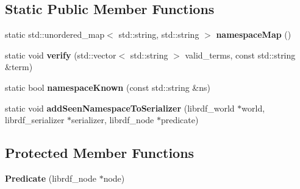 \subsection*{Static Public Member Functions}
\begin{DoxyCompactItemize}
\item 
\mbox{\label{classsemsim_1_1Predicate_a332f745e39155ff5884e2c98c87b548b}} 
static std\+::unordered\+\_\+map$<$ std\+::string, std\+::string $>$ {\bfseries namespace\+Map} ()
\item 
\mbox{\label{classsemsim_1_1Predicate_a3e4b6a9dd8180026ef09d8234076655f}} 
static void {\bfseries verify} (std\+::vector$<$ std\+::string $>$ valid\+\_\+terms, const std\+::string \&term)
\item 
\mbox{\label{classsemsim_1_1Predicate_a514f441587bc049f53666c55a5d645ce}} 
static bool {\bfseries namespace\+Known} (const std\+::string \&ns)
\item 
\mbox{\label{classsemsim_1_1Predicate_a47b3b6a018b2d1085c0feaf504e12568}} 
static void {\bfseries add\+Seen\+Namespace\+To\+Serializer} (librdf\+\_\+world $\ast$world, librdf\+\_\+serializer $\ast$serializer, librdf\+\_\+node $\ast$predicate)
\end{DoxyCompactItemize}
\subsection*{Protected Member Functions}
\begin{DoxyCompactItemize}
\item 
\mbox{\label{classsemsim_1_1Predicate_a90af4d016315412f8fd64d9ec280b177}} 
{\bfseries Predicate} (librdf\+\_\+node $\ast$node)
\end{DoxyCompactItemize}
